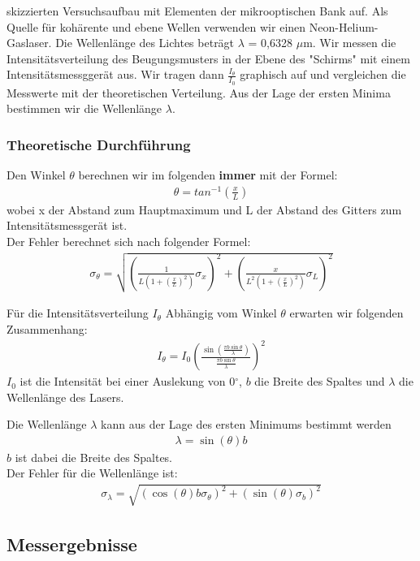 \documentclass[12pt]{scrartcl}
\begin{document}
skizzierten Versuchsaufbau mit Elementen der mikrooptischen Bank auf. Als Quelle für kohärente und ebene Wellen verwenden wir einen Neon-Helium-Gaslaser. Die Wellenlänge des Lichtes beträgt $\lambda$ = 0,6328 $\mu$m.
Wir messen die Intensitätsverteilung des Beugungsmusters in der Ebene des "Schirms" mit einem Intensitätsmessggerät aus. Wir tragen dann $\frac{I_\theta}{I_0}$ graphisch auf und vergleichen die Messwerte mit der theoretischen Verteilung. Aus der Lage der ersten Minima bestimmen wir die Wellenlänge $\lambda$.
\subsubsection{Theoretische Durchführung}
Den Winkel $\theta$ berechnen wir im folgenden \textbf{immer} mit der Formel:
\begin{align}
\theta = tan^{-1}(\frac{x}{L})
\end{align}
wobei x der Abstand zum Hauptmaximum und L der Abstand des Gitters zum Intensitätsmessgerät ist.\\
Der Fehler berechnet sich nach folgender Formel:
\begin{align}
\sigma_\theta = \sqrt{
\left(\frac{1}{L\left(1+\left(\frac{x}{L}\right)^2\right)}\sigma_x\right)^2+
\left(\frac{x}{L^2\left(1+\left(\frac{x}{L}\right)^2\right)}\sigma_L\right)^2}
\end{align}

Für die Intensitätsverteilung $I_\theta$ Abhängig vom Winkel $\theta$ erwarten wir folgenden Zusammenhang:
\begin{align}
I_\theta = I_0 \left(\frac{\sin \left(\frac{\pi b \sin{\theta}}{\lambda}\right)}{\frac{\pi b \sin{\theta}}{\lambda}}\right)^2
\label{eqn:I_theta_Einzelspalt}
\end{align}
$I_0$ ist die Intensität bei einer Auslekung von 0$^{\circ}$, $b$ die Breite des Spaltes und $\lambda$ die Wellenlänge des Lasers.

Die Wellenlänge $\lambda$ kann aus der Lage des ersten Minimums bestimmt werden
\begin{align}
\lambda = \sin(\theta) b
\label{eqn:lambda_a_1}
\end{align}
$b$ ist dabei die Breite des Spaltes.\\
Der Fehler für die Wellenlänge ist:
\begin{align}
\sigma_\lambda = \sqrt{
\left(\cos(\theta)b \sigma_\theta\right)^2+
\left(\sin(\theta) \sigma_b\right)^2}
\label{eqn:lambda_a_1_sigma}
\end{align}
\subsection{Messergebnisse}
\end{document}
